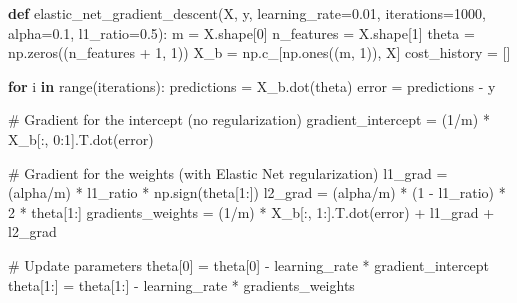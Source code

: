 \documentclass[
  letterpaper,
  DIV=11,
  numbers=noendperiod]{scrreprt}
\newenvironment{Shaded}{\begin{snugshade}}{\end{snugshade}}
\newcommand{\BuiltInTok}[1]{\textcolor[rgb]{0.00,0.23,0.31}{#1}}
\newcommand{\CommentTok}[1]{\textcolor[rgb]{0.37,0.37,0.37}{#1}}
\newcommand{\ControlFlowTok}[1]{\textcolor[rgb]{0.00,0.23,0.31}{\textbf{#1}}}
\newcommand{\DecValTok}[1]{\textcolor[rgb]{0.68,0.00,0.00}{#1}}
\newcommand{\FloatTok}[1]{\textcolor[rgb]{0.68,0.00,0.00}{#1}}
\newcommand{\KeywordTok}[1]{\textcolor[rgb]{0.00,0.23,0.31}{\textbf{#1}}}
\newcommand{\NormalTok}[1]{\textcolor[rgb]{0.00,0.23,0.31}{#1}}
\newcommand{\OperatorTok}[1]{\textcolor[rgb]{0.37,0.37,0.37}{#1}}
\begin{document}
\begin{Shaded}
\begin{Highlighting}[]
\KeywordTok{def}\NormalTok{ elastic\_net\_gradient\_descent(X, y, learning\_rate}\OperatorTok{=}\FloatTok{0.01}\NormalTok{, iterations}\OperatorTok{=}\DecValTok{1000}\NormalTok{, alpha}\OperatorTok{=}\FloatTok{0.1}\NormalTok{, l1\_ratio}\OperatorTok{=}\FloatTok{0.5}\NormalTok{):}
\NormalTok{    m }\OperatorTok{=}\NormalTok{ X.shape[}\DecValTok{0}\NormalTok{]}
\NormalTok{    n\_features }\OperatorTok{=}\NormalTok{ X.shape[}\DecValTok{1}\NormalTok{]}
\NormalTok{    theta }\OperatorTok{=}\NormalTok{ np.zeros((n\_features }\OperatorTok{+} \DecValTok{1}\NormalTok{, }\DecValTok{1}\NormalTok{))}
\NormalTok{    X\_b }\OperatorTok{=}\NormalTok{ np.c\_[np.ones((m, }\DecValTok{1}\NormalTok{)), X]}
\NormalTok{    cost\_history }\OperatorTok{=}\NormalTok{ []}
    
    \ControlFlowTok{for}\NormalTok{ i }\KeywordTok{in} \BuiltInTok{range}\NormalTok{(iterations):}
\NormalTok{        predictions }\OperatorTok{=}\NormalTok{ X\_b.dot(theta)}
\NormalTok{        error }\OperatorTok{=}\NormalTok{ predictions }\OperatorTok{{-}}\NormalTok{ y}
        
        \CommentTok{\# Gradient for the intercept (no regularization)}
\NormalTok{        gradient\_intercept }\OperatorTok{=}\NormalTok{ (}\DecValTok{1}\OperatorTok{/}\NormalTok{m) }\OperatorTok{*}\NormalTok{ X\_b[:, }\DecValTok{0}\NormalTok{:}\DecValTok{1}\NormalTok{].T.dot(error)}
        
        \CommentTok{\# Gradient for the weights (with Elastic Net regularization)}
\NormalTok{        l1\_grad }\OperatorTok{=}\NormalTok{ (alpha}\OperatorTok{/}\NormalTok{m) }\OperatorTok{*}\NormalTok{ l1\_ratio }\OperatorTok{*}\NormalTok{ np.sign(theta[}\DecValTok{1}\NormalTok{:])}
\NormalTok{        l2\_grad }\OperatorTok{=}\NormalTok{ (alpha}\OperatorTok{/}\NormalTok{m) }\OperatorTok{*}\NormalTok{ (}\DecValTok{1} \OperatorTok{{-}}\NormalTok{ l1\_ratio) }\OperatorTok{*} \DecValTok{2} \OperatorTok{*}\NormalTok{ theta[}\DecValTok{1}\NormalTok{:]}
\NormalTok{        gradients\_weights }\OperatorTok{=}\NormalTok{ (}\DecValTok{1}\OperatorTok{/}\NormalTok{m) }\OperatorTok{*}\NormalTok{ X\_b[:, }\DecValTok{1}\NormalTok{:].T.dot(error) }\OperatorTok{+}\NormalTok{ l1\_grad }\OperatorTok{+}\NormalTok{ l2\_grad}
        
        \CommentTok{\# Update parameters}
\NormalTok{        theta[}\DecValTok{0}\NormalTok{] }\OperatorTok{=}\NormalTok{ theta[}\DecValTok{0}\NormalTok{] }\OperatorTok{{-}}\NormalTok{ learning\_rate }\OperatorTok{*}\NormalTok{ gradient\_intercept}
\NormalTok{        theta[}\DecValTok{1}\NormalTok{:] }\OperatorTok{=}\NormalTok{ theta[}\DecValTok{1}\NormalTok{:] }\OperatorTok{{-}}\NormalTok{ learning\_rate }\OperatorTok{*}\NormalTok{ gradients\_weights}
        

\end{Highlighting}
\end{Shaded}
\end{document}
